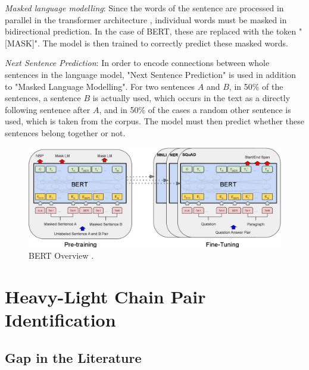 \textit{Masked language modelling}: Since the words of the sentence are processed in parallel in the transformer architecture \cite{Vaswani2017}, individual words must be masked in bidirectional prediction. In the case of BERT, these are replaced with the token "[MASK]". The model is then trained to correctly predict these masked words.

\textit{Next Sentence Prediction}: In order to encode connections between whole sentences in the language model, "Next Sentence Prediction" is used in addition to "Masked Language Modelling". For two sentences $A$ and $B$, in 50\% of the sentences, a sentence $B$ is actually used, which occurs in the text as a directly following sentence after $A$, and in 50\% of the cases a random other sentence is used, which is taken from the corpus. The model must then predict whether these sentences belong together or not.

\begin{figure}[h]
 \centering
 \includegraphics[width=15.5cm]{images/bert_architecture.png}
 \caption{BERT Overview \citep{Devlin2019}.}
 \label{bert_overview}
\end{figure}



\section{Heavy-Light Chain Pair Identification}



\subsection{Gap in the Literature}


